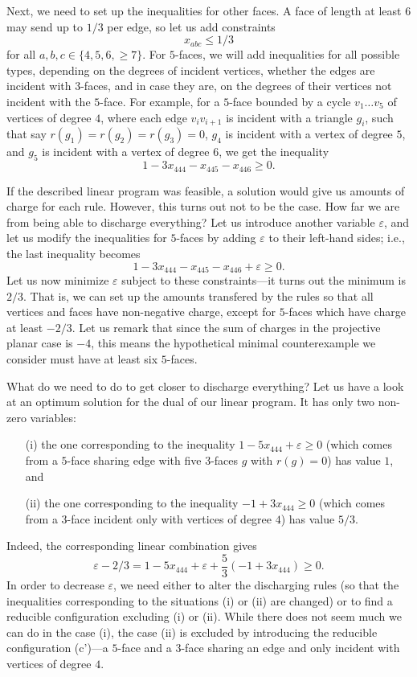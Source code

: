 \documentclass[12pt,twoside,openright,a4paper]{book}
\begin{document}
Next, we need to set up the inequalities for other faces.  A face of length at least $6$ may send up to $1/3$ per edge,
so let us add constraints
$$x_{abc}\le 1/3$$
for all $a,b,c\in\{4,5,6,{\ge\!7}\}$.
For $5$-faces, we will add inequalities for all possible types, depending on the degrees of incident vertices, whether
the edges are incident with $3$-faces, and in case they are, on the degrees of their vertices not incident with the $5$-face.
For example, for a $5$-face bounded by a cycle $v_1\ldots v_5$ of vertices of degree $4$, where each edge $v_iv_{i+1}$ is incident with
a triangle $g_i$, such that say $r(g_1)=r(g_2)=r(g_3)=0$, $g_4$ is incident with a vertex of degree $5$, and $g_5$ is incident with
a vertex of degree $6$, we get the inequality
$$1-3x_{444}-x_{445}-x_{446}\ge 0.$$

If the described linear program was feasible, a solution would give us amounts of charge for each rule.
However, this turns out not to be the case.  How far we are from being able to discharge everything?
Let us introduce another variable $\varepsilon$, and let us modify the inequalities for $5$-faces by adding $\varepsilon$ to their
left-hand sides; i.e., the last inequality becomes
$$1-3x_{444}-x_{445}-x_{446}+\varepsilon\ge 0.$$
Let us now minimize $\varepsilon$ subject to these constraints---it turns out the minimum is $2/3$.  That is, we can set up the amounts
transfered by the rules so that all vertices and faces have non-negative charge, except for $5$-faces which have charge at least $-2/3$.
Let us remark that since the sum of charges in the projective planar case is $-4$, this means the hypothetical minimal counterexample
we consider must have at least six $5$-faces.

What do we need to do to get closer to discharge everything?  Let us have a look at an optimum solution for the dual of
our linear program.  It has only two non-zero variables:
\begin{itemize}
\item[(i)] the one corresponding to the inequality $1-5x_{444}+\varepsilon\ge 0$
(which comes from a $5$-face sharing edge with five $3$-faces $g$ with $r(g)=0$) has value $1$, and
\item[(ii)] the one corresponding to the inequality $-1+3x_{444}\ge 0$ (which comes from a $3$-face incident only with vertices of degree $4$) has value $5/3$.
\end{itemize}
Indeed, the corresponding linear combination gives
$$\varepsilon-2/3=1-5x_{444}+\varepsilon+\frac{5}{3}(-1+3x_{444})\ge 0.$$
In order to decrease $\varepsilon$, we need either to alter the discharging rules (so that the inequalities corresponding to
the situations (i) or (ii) are changed) or to find a reducible configuration excluding (i) or (ii).  While there does not
seem much we can do in the case (i), the case (ii) is excluded by introducing the reducible configuration (c')---a $5$-face and a $3$-face
sharing an edge and only incident with vertices of degree $4$.
\end{document}
